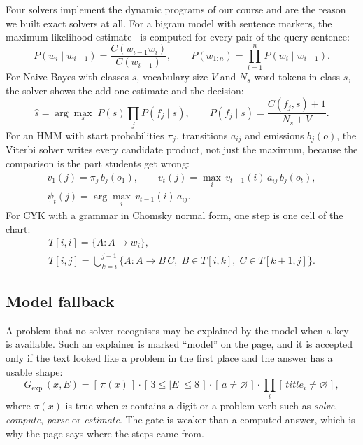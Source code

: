 \documentclass[runningheads]{llncs}
\begin{document}
Four solvers implement the dynamic programs of our course and are the reason we built exact solvers at all. For a bigram model
with sentence markers, the maximum-likelihood estimate~\cite{jurafsky2025} is computed for every pair of the query sentence:
\begin{equation}
P(w_i \mid w_{i-1}) = \frac{C(w_{i-1} w_i)}{C(w_{i-1})}, \qquad P(w_{1:n}) = \prod_{i=1}^{n} P(w_i \mid w_{i-1}).
\end{equation}
For Naive Bayes with classes $s$, vocabulary size $V$ and $N_s$ word tokens in class $s$, the solver shows the add-one estimate
and the decision:
\begin{equation}
\hat{s} = \arg\max_{s}\; P(s) \prod_{j} P(f_j \mid s), \qquad P(f_j \mid s) = \frac{C(f_j, s) + 1}{N_s + V}.
\end{equation}
For an HMM with start probabilities $\pi_j$, transitions $a_{ij}$ and emissions $b_j(o)$, the Viterbi solver writes every
candidate product, not just the maximum, because the comparison is the part students get wrong:
\begin{gather}
v_1(j) = \pi_j\, b_j(o_1), \qquad v_t(j) = \max_{i}\, v_{t-1}(i)\, a_{ij}\, b_j(o_t),\\
\psi_t(j) = \arg\max_{i}\, v_{t-1}(i)\, a_{ij}.
\end{gather}
For CYK with a grammar in Chomsky normal form, one step is one cell of the chart:
\begin{gather}
T[i,i] = \{A : A \to w_i\},\\
T[i,j] = \bigcup_{k=i}^{j-1}\{A : A \to B\,C,\; B \in T[i,k],\; C \in T[k{+}1,j]\}.
\end{gather}

\subsection{Model fallback}
A problem that no solver recognises may be explained by the model when a key is available. Such an explainer is marked
``model'' on the page, and it is accepted only if the text looked like a problem in the first place and the answer has a usable
shape:
\begin{equation}
\label{eq:llm}
G_{\text{expl}}(x, E) = [\,\pi(x)\,] \cdot [\,3 \le |E| \le 8\,] \cdot [\,a \ne \varnothing\,] \cdot \prod_{i}[\,\mathit{title}_i \ne \varnothing\,],
\end{equation}
where $\pi(x)$ is true when $x$ contains a digit or a problem verb such as \emph{solve}, \emph{compute}, \emph{parse} or
\emph{estimate}. The gate is weaker than a computed answer, which is why the page says where the steps came from.
\end{document}
